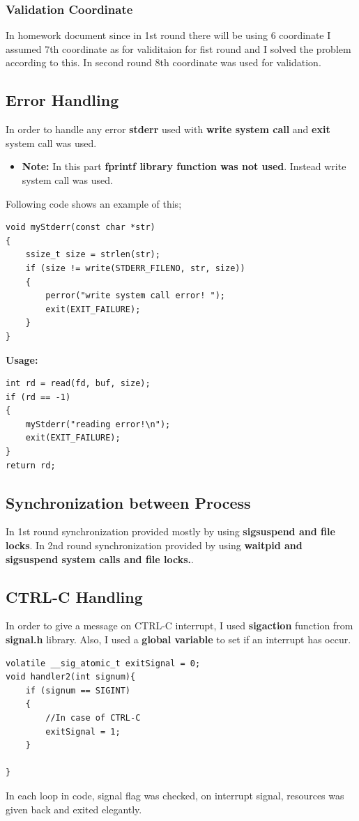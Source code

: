 \documentclass{article}
\begin{document}
\subsubsection{Validation Coordinate}
In homework document since in 1st round there will be using 6 coordinate I assumed 7th coordinate
as for validitaion for fist round and I solved the problem according to this. In second round 8th coordinate was
used for validation.
\subsection{Error Handling}
In order to handle any error \textbf{stderr} used with \textbf{write system call} and \textbf{exit} system call was used.
\begin{itemize}
	\item \textbf{Note:} In this part \textbf{fprintf library function was not used}. Instead write system call was used.
\end{itemize}
Following code shows an example of this;
\begin{lstlisting}[style=CStyle]
void myStderr(const char *str)
{
    ssize_t size = strlen(str);
    if (size != write(STDERR_FILENO, str, size))
    {
        perror("write system call error! ");
        exit(EXIT_FAILURE);
    }
}
\end{lstlisting}
\textbf{Usage:}
\begin{lstlisting}[style=CStyle]
int rd = read(fd, buf, size);
if (rd == -1)
{
    myStderr("reading error!\n");
    exit(EXIT_FAILURE);
}
return rd; 
\end{lstlisting}
\subsection{Synchronization between Process}
In 1st round synchronization provided mostly by using \textbf{sigsuspend and file locks}. In 2nd round
synchronization provided by using \textbf{waitpid and sigsuspend system calls and file locks.}.

\subsection{CTRL-C Handling}
In order to give a message on CTRL-C interrupt, I used \textbf{sigaction} function from \textbf{signal.h} library.
Also, I used a \textbf{global variable} to set if an interrupt has occur.
\begin{lstlisting}[style=CStyle]
volatile __sig_atomic_t exitSignal = 0;
void handler2(int signum){
    if (signum == SIGINT)
    {
        //In case of CTRL-C 
        exitSignal = 1;
    }
    
}
\end{lstlisting}
In each loop in code, signal flag was checked, on interrupt signal, resources was given back and exited elegantly.
\end{document}
